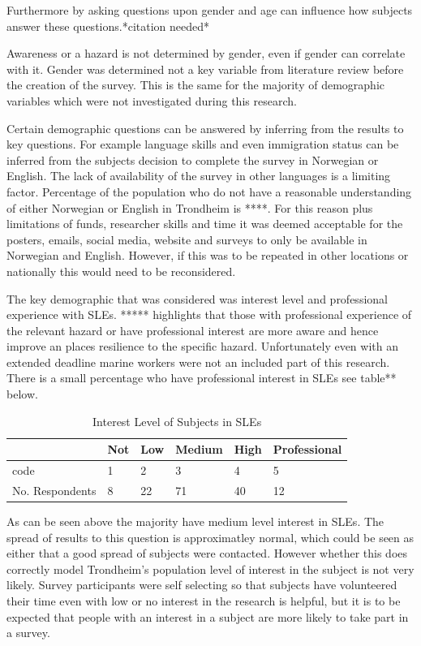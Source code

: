 Furthermore by asking questions upon gender and age can influence how subjects answer these questions.*citation needed*

Awareness or a hazard is not determined by gender, even if gender can correlate with it.  Gender was determined not a key variable from literature review before the creation of the survey. This is the same for the majority of demographic variables which were not investigated during this research.

Certain demographic questions can be answered by inferring from the results to key questions. For example language skills and even immigration status can be inferred from the subjects decision to complete the survey in Norwegian or English. The lack of availability of the survey in other languages is a limiting factor. Percentage of the population who do not have a reasonable understanding of either Norwegian or English in Trondheim is ****. For this reason plus limitations of funds, researcher skills and time it was deemed acceptable for the posters, emails, social media, website and surveys to only be available in Norwegian and English. However, if this was to be repeated in other locations or nationally this would need to be reconsidered. 

The key demographic that was considered was interest level and professional experience with SLEs. ***** highlights that those with professional experience of the relevant hazard or have professional interest are more aware and hence improve an places resilience to the specific hazard. Unfortunately even with an extended deadline marine workers were not an included part of this research. There is a small percentage who have professional interest in SLEs see table** below. 

\begin{table}[h]
    \centering
    \begin{tabular}{|l|l|l|l|l|l|}
    \hline
       & Not & Low & Medium & High & Professional \\ \hline
       code & 1 & 2 & 3 & 4 & 5 \\ \hline
        No. Respondents & 8 & 22 & 71 & 40 & 12 \\ \hline
    \end{tabular}
    \caption{Interest Level of Subjects in SLEs}
    \label{interest_level_table}
\end{table}

As can be seen above the majority have medium level interest in SLEs. The spread of results to this question is approximatley normal, which could be seen as either that a good spread of subjects were contacted. However whether this does correctly model Trondheim's population level of interest in the subject is not very likely.  Survey participants were self selecting so that subjects have volunteered their time even with low or no interest in the research is helpful, but it is to be expected that people with an interest in a subject are more likely to take part in a survey.

